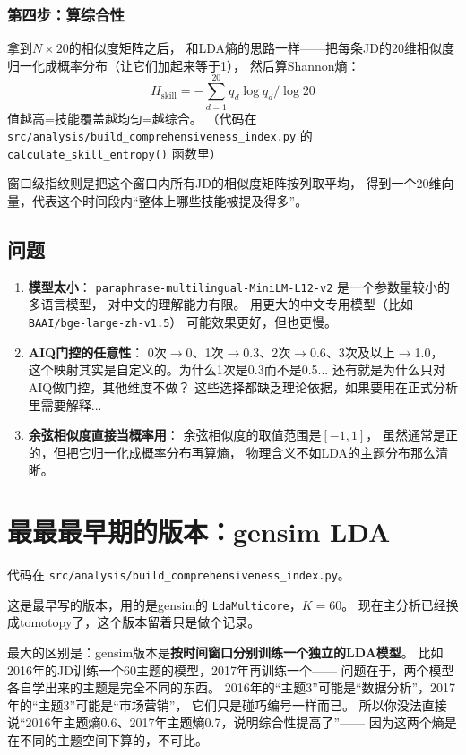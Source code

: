 \documentclass[12pt,a4paper]{ctexart}
\begin{document}
\subsubsection{第四步：算综合性}

拿到$N \times 20$的相似度矩阵之后，
和LDA熵的思路一样——把每条JD的20维相似度归一化成概率分布（让它们加起来等于1），
然后算Shannon熵：
\[
H_{\text{skill}} = -\sum_{d=1}^{20} q_d \log q_d \bigg/ \log 20
\]
值越高=技能覆盖越均匀=越综合。
（代码在 \texttt{src/analysis/build\_comprehensiveness\_index.py}
的 \texttt{calculate\_skill\_entropy()} 函数里）

窗口级指纹则是把这个窗口内所有JD的相似度矩阵按列取平均，
得到一个20维向量，代表这个时间段内``整体上哪些技能被提及得多''。

\subsection{问题}
\begin{enumerate}
\item \textbf{模型太小}：
\texttt{paraphrase-multilingual-MiniLM-L12-v2} 是一个参数量较小的多语言模型，
对中文的理解能力有限。
用更大的中文专用模型（比如 \texttt{BAAI/bge-large-zh-v1.5}）
可能效果更好，但也更慢。
\item \textbf{AIQ门控的任意性}：
0次$\to$0、1次$\to$0.3、2次$\to$0.6、3次及以上$\to$1.0，
这个映射其实是自定义的。为什么1次是0.3而不是0.5...
还有就是为什么只对AIQ做门控，其他维度不做？
这些选择都缺乏理论依据，如果要用在正式分析里需要解释...
\item \textbf{余弦相似度直接当概率用}：
余弦相似度的取值范围是$[-1, 1]$，
虽然通常是正的，但把它归一化成概率分布再算熵，
物理含义不如LDA的主题分布那么清晰。
\end{enumerate}


\section{最最最早期的版本：gensim LDA}
\label{sec:gensim}

代码在 \texttt{src/analysis/build\_comprehensiveness\_index.py}。

这是最早写的版本，用的是gensim的 \texttt{LdaMulticore}，$K = 60$。
现在主分析已经换成tomotopy了，这个版本留着只是做个记录。

最大的区别是：gensim版本是\textbf{按时间窗口分别训练一个独立的LDA模型}。
比如2016年的JD训练一个60主题的模型，2017年再训练一个——
问题在于，两个模型各自学出来的主题是完全不同的东西。
2016年的``主题3''可能是``数据分析''，2017年的``主题3''可能是``市场营销''，
它们只是碰巧编号一样而已。
所以你没法直接说``2016年主题熵0.6、2017年主题熵0.7，说明综合性提高了''——
因为这两个熵是在不同的主题空间下算的，不可比。
\end{document}
